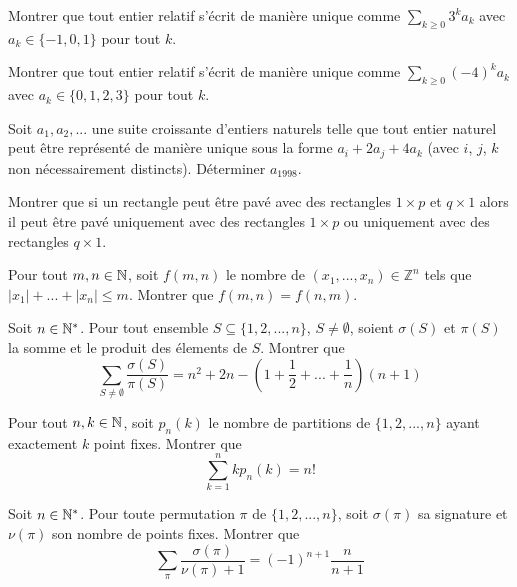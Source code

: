 \begin{exo}
Montrer que tout entier relatif s'écrit de manière unique comme $\sum_{k\geq 0}3^ka_k$ avec $a_k\in\{-1,0,1\}$ pour tout $k$.
\end{exo}

\begin{exo}
Montrer que tout entier relatif s'écrit de manière unique comme $\sum_{k\geq 0}(-4)^ka_k$ avec $a_k\in\{0,1,2,3\}$ pour tout $k$.
\end{exo}

\begin{exo}
Soit $a_1,a_2,...$ une suite croissante d'entiers naturels telle que tout entier naturel peut être représenté de manière unique sous la
forme $a_i +2a_j +4a_k$ (avec $i$, $j$, $k$ non nécessairement distincts). Déterminer $a_{1998}$.
\end{exo}

\begin{exo}
Montrer que si un rectangle peut être pavé avec des rectangles $1\times p$ et $q\times 1$ alors il peut être pavé uniquement avec des rectangles $1\times p$ ou uniquement avec des rectangles $q\times 1$.
\end{exo}

\begin{exo}
Pour tout $m,n\in\mathbb N$, soit $f(m,n)$ le nombre de $(x_1,...,x_n)\in\mathbb{Z}^n$ tels que $|x_1|+...+|x_n|\leq m$. Montrer que $f(m,n)=f(n,m)$.
\end{exo}

\begin{exo}
Soit $n\in\mathbb N^*$. Pour tout ensemble $S\subseteq \{1,2,...,n\}$, $S\neq\emptyset$, soient $\sigma(S)$ et $\pi(S)$ la somme et le produit des élements de $S$. Montrer que
\[\sum_{S\neq\emptyset}\frac{\sigma(S)}{\pi(S)}=n^2+2n-(1+\frac{1}{2}+...+\frac{1}{n})(n+1)\]
\end{exo}

\begin{exo}
Pour tout $n,k\in\mathbb N$, soit $p_n(k)$ le nombre de partitions de $\{1,2,...,n\}$ ayant exactement $k$ point fixes. Montrer que
\[\sum_{k=1}^n kp_n(k)=n!\]
\end{exo}

\begin{exo}
Soit $n\in\mathbb N^*$. Pour toute permutation $\pi$ de $\{1,2,...,n\}$, soit $\sigma(\pi)$ sa signature et $\nu(\pi)$ son nombre de points fixes. Montrer que
\[\sum_{\pi}\frac{\sigma(\pi)}{\nu(\pi)+1}=(-1)^{n+1}\frac{n}{n+1}\]
\end{exo}